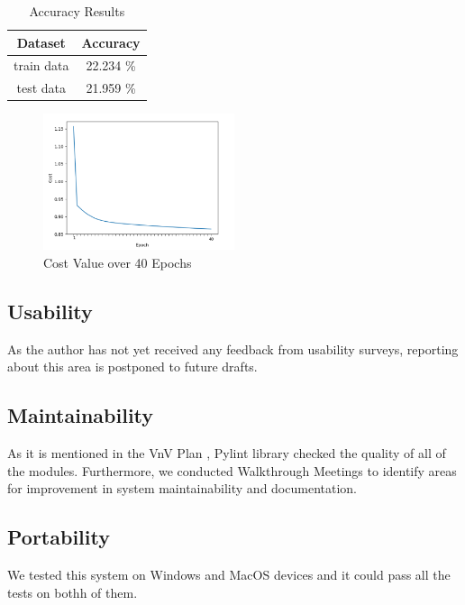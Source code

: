 \documentclass[12pt, titlepage]{article}
\begin{document}
\begin{table}[h!]
  \begin{center}
  \begin{tabular}{ |c|c|}
  \hline
  Dataset & Accuracy \\
  \hline
  train data & 22.234 \%\\
  \hline
  test data & 21.959 \%\\
  \hline
  \end{tabular}
  \caption{Accuracy Results}
  \label{Accuracy}
  \end{center}
  \end{table}
		
  \begin{figure}[H]
    \centering
    \includegraphics[width=0.5\textwidth]{Cost.png}
    \caption{Cost Value over 40 Epochs}
    \label{FigUH}
    \end{figure}

\subsection{Usability}

As the author has not yet received any feedback from usability surveys, 
reporting about this area is postponed to future drafts.

\subsection{Maintainability}

As it is mentioned in the VnV Plan \citep{VnVPlan}, 
Pylint \citep{pylint} library checked the quality of all of the modules.
Furthermore, we conducted Walkthrough Meetings to identify areas 
for improvement in system maintainability and documentation.

\subsection{Portability}

We tested this system on Windows and MacOS devices and it could pass
all the tests on bothh of them.
\end{document}
